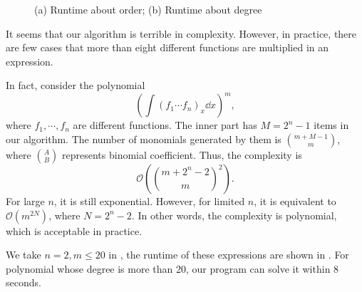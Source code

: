 \begin{figure}[htb]
\centering
{}
\caption{(a) Runtime about order; (b) Runtime about degree}
\end{figure}

It seems that our algorithm is terrible in complexity. However, in practice, there are few cases that more than eight different functions are multiplied in an expression.

In fact, consider the polynomial 
\begin{equation}
\left(\int\!{(f_1\cdots f_n)_x\dd x}\right)^m,
\label{poly}
\end{equation}
where $f_1,\cdots,f_n$ are different functions. The inner part has $M=2^n-1$ items in our algorithm. The number of  monomials generated by them is $\binom{m+M-1}{m}$, where $\binom{A}{B}$ represents binomial coefficient. Thus, the complexity is 
\begin{equation}
\mathcal O\left(\binom{m+2^n-2}{m}^2\right).
\label{polynomial_complexity}    
\end{equation}
For large $n$, it is still exponential. However, for limited $n$, it is equivalent to $\mathcal O(m^{2N})$, where $N=2^n-2$. In other words, the complexity is polynomial, which is acceptable in practice. 

We take $n=2,m\le 20$ in , the runtime of these expressions are shown in . For polynomial whose degree is more than 20, our program can solve it within 8 seconds. 

